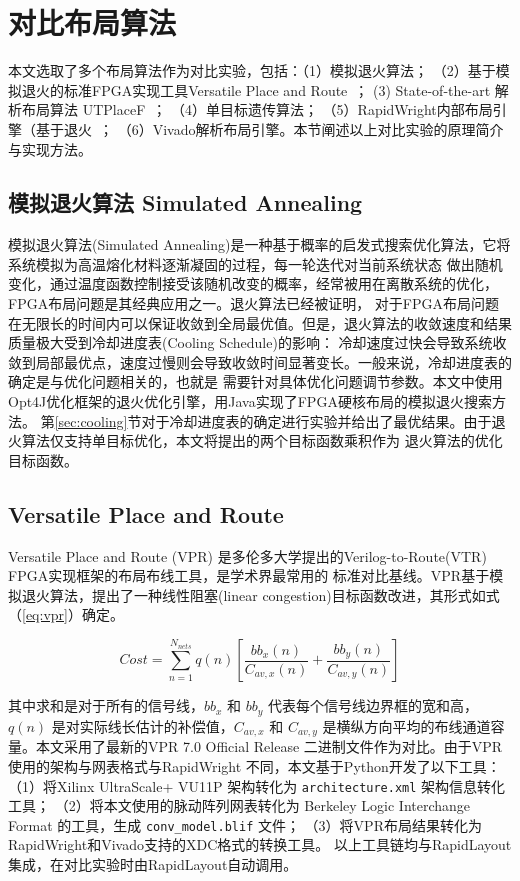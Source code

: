 \section{对比布局算法}
本文选取了多个布局算法作为对比实验，包括：（1）模拟退火算法； （2）基于模拟退火的标准FPGA实现工具Versatile Place and Route~\cite{vtr2014}；
(3) State-of-the-art 解析布局算法 UTPlaceF~\cite{li2017utplacef}； （4）单目标遗传算法； （5）RapidWright内部布局引擎（基于退火~\cite{lavin2018rapidwright}；
（6）Vivado解析布局引擎。本节阐述以上对比实验的原理简介与实现方法。

\subsection{模拟退火算法 Simulated Annealing}
\label{sec:sa}

模拟退火算法(Simulated Annealing)是一种基于概率的启发式搜索优化算法，它将系统模拟为高温熔化材料逐渐凝固的过程，每一轮迭代对当前系统状态
做出随机变化，通过温度函数控制接受该随机改变的概率，经常被用在离散系统的优化，FPGA布局问题是其经典应用之一。退火算法已经被证明，
对于FPGA布局问题在无限长的时间内可以保证收敛到全局最优值。但是，退火算法的收敛速度和结果质量极大受到冷却进度表(Cooling Schedule)的影响：
冷却速度过快会导致系统收敛到局部最优点，速度过慢则会导致收敛时间显著变长。一般来说，冷却进度表的确定是与优化问题相关的，也就是
需要针对具体优化问题调节参数。本文中使用Opt4J优化框架的退火优化引擎，用Java实现了FPGA硬核布局的模拟退火搜索方法。
第\ref{sec:cooling}节对于冷却进度表的确定进行实验并给出了最优结果。由于退火算法仅支持单目标优化，本文将提出的两个目标函数乘积作为
退火算法的优化目标函数。

\subsection{Versatile Place and Route}

Versatile Place and Route (VPR) 是多伦多大学提出的Verilog-to-Route(VTR)~\cite{vtr2014} FPGA实现框架的布局布线工具，是学术界最常用的
标准对比基线。VPR基于模拟退火算法，提出了一种线性阻塞(linear congestion)目标函数改进，其形式如式（\ref{eq:vpr}）确定。

\begin{equation}
Cost = \sum_{n=1}^{N_{nets}} q(n) [ \frac{bb_x(n)}{C_{av,x}(n)} + \frac{bb_y(n)}{C_{av,y}(n)} ] 
\label{eq:vpr}
\end{equation}

其中求和是对于所有的信号线，$bb_x$ 和 $bb_y$ 代表每个信号线边界框的宽和高，$q(n)$ 是对实际线长估计的补偿值，$C_{av,x}$ 和 $C_{av,y}$
是横纵方向平均的布线通道容量。本文采用了最新的VPR 7.0 Official Release 二进制文件作为对比。由于VPR使用的架构与网表格式与RapidWright
不同，本文基于Python开发了以下工具：（1）将Xilinx UltraScale+ VU11P 架构转化为 \texttt{architecture.xml} 架构信息转化工具；
（2）将本文使用的脉动阵列网表转化为 Berkeley Logic Interchange Format 的工具，生成 \texttt{conv\_model.blif} 文件；
（3）将VPR布局结果转化为RapidWright和Vivado支持的XDC格式的转换工具。
以上工具链均与RapidLayout集成，在对比实验时由RapidLayout自动调用。

